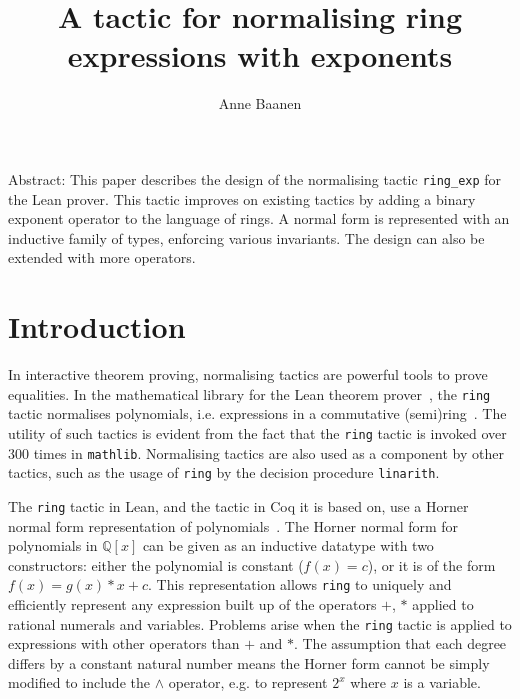 \documentclass{llncs}
\title{A tactic for normalising ring expressions with exponents}
\author{Anne Baanen}
\institute{Vrije Universiteit Amsterdam}
\newcommand{\Q}{\mathbb{Q}}
\newcommand{\lean}[1]{\texttt{#1}\xspace} %
\newcommand{\pow}{$\wedge$\xspace}
\newcommand{\ringexp}{\lean{ring\_exp}}
\begin{document}
\maketitle

Abstract:
This paper describes the design of the normalising tactic \ringexp for the Lean prover.
This tactic improves on existing tactics by adding a binary exponent operator to the language of rings.
A normal form is represented with an inductive family of types, enforcing various invariants.
The design can also be extended with more operators.

\section{Introduction}

In interactive theorem proving, normalising tactics are powerful tools to prove equalities.
In the mathematical library for the Lean theorem prover~\cite{lean-prover},
the \lean{ring} tactic normalises polynomials, i.e. expressions in a commutative (semi)ring~\cite{mathlib}.
The utility of such tactics is evident from the fact that the \lean{ring} tactic is invoked over 300 times in \texttt{mathlib}.
Normalising tactics are also used as a component by other tactics,
such as the usage of \lean{ring} by the decision procedure \lean{linarith}.

The \lean{ring} tactic in Lean, and the tactic in Coq it is based on,
use a Horner normal form representation of polynomials~\cite{ring-tactic}.
The Horner normal form for polynomials in $\Q[x]$ can be given as an inductive datatype with two constructors:
either the polynomial is constant ($f(x) = c$),
or it is of the form $f(x) = g(x) * x + c$.
This representation
allows \lean{ring} to uniquely and efficiently represent any expression built up of the operators $+$, $*$ applied to rational numerals and variables.
Problems arise when the \lean{ring} tactic is applied to expressions with other operators than $+$ and $*$.
The assumption that each degree differs by a constant natural number
means the Horner form cannot be simply modified to include the \pow operator,
e.g. to represent $2^x$ where $x$ is a variable.
\end{document}
